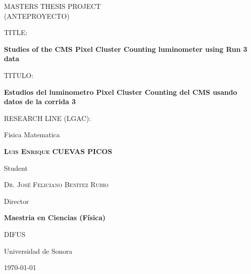 \documentclass[final,12pt]{article}
\def\Student{Luis Enrique CUEVAS PICOS }
\def\Title{MASTERS THESIS PROJECT}
\def\TitleESP{(ANTEPROYECTO)}
\def\Prog{Maestria en Ciencias (F\'{i}sica) }
\def\Dept{DIFUS}
\def\Institution{Universidad de Sonora}
\def\Director{Dr. Jos\'{e} Feliciano Ben\'{i}tez Rubio}
\def\ProjectTitle{Studies of the CMS Pixel Cluster Counting luminometer using Run 3 data}
\def\ProjectTitleESP{Estudios del luminometro Pixel Cluster Counting del CMS usando datos de la corrida 3}
\def\ResearchLine{Fisica Matematica}
\begin{document}
\onehalfspacing

\begin{titlepage}
\centering
\hspace{0pt}
{\scshape\Large \Title \\ \TitleESP \par}
  
  \vspace{1cm}
  {
    TITLE:\par
    {\bf \large \ProjectTitle  \par}
    \vspace{\baselineskip}   
    \vspace{0.4cm}
    TITULO:\par
    {\bf \large \ProjectTitleESP \par}
  }
       
  \vspace{1cm}
  {
    RESEARCH LINE (LGAC): \par
    \ResearchLine \par
  }
        
  \vspace{2cm}
  {\underline{\hspace{8cm}}\par}
  {\bf \scshape \Student \par}
  {Student\par}

  \vspace{1cm}
  {\underline{\hspace{8cm}}\par}
  {\scshape \Director \par}
  {Director\par}

  \vspace{1cm}
  {\bf \Prog \par}
  {\Dept \par}
  {\Institution \par}

  \vspace{2cm}
  {\today}

\hspace{0pt}
\vfill

\end{titlepage}


\shipout\null


\newpage
\hspace{2pt}
\vfill
\end{document}
